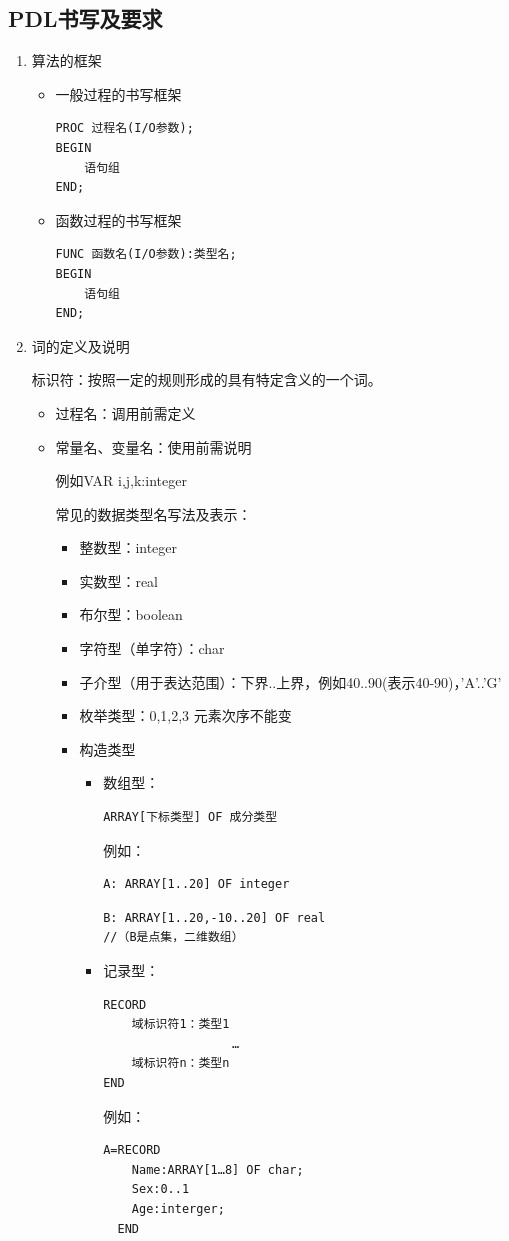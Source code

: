 \documentclass[AutoFakeBold]{LZUThesis2007}
\begin{document}
		\subsection{PDL书写及要求}
			\begin{enumerate}
				\item 算法的框架
					\begin{itemize}
						\item 一般过程的书写框架
\begin{lstlisting}
PROC 过程名(I/O参数);
BEGIN
	语句组
END;
\end{lstlisting}
						\item 函数过程的书写框架
\begin{lstlisting}
FUNC 函数名(I/O参数):类型名;
BEGIN
	语句组
END;
\end{lstlisting}
					\end{itemize}
				\item 词的定义及说明

						标识符：按照一定的规则形成的具有特定含义的一个词。
						\begin{itemize}
							\item 过程名：调用前需定义
							\item 常量名、变量名：使用前需说明

									例如VAR i,j,k:integer

									常见的数据类型名写法及表示：
									\begin{itemize}
										\item 整数型：integer
										\item 实数型：real
										\item 布尔型：boolean
										\item 字符型（单字符）：char
										\item 子介型（用于表达范围）：下界..上界，例如40..90(表示40-90)，'A'..'G'
										\item 枚举类型：{0,1,2,3}  元素次序不能变
										\item 构造类型
											\begin{itemize}
												\item 数组型：
\begin{lstlisting}
ARRAY[下标类型] OF 成分类型
\end{lstlisting}
												例如：
\begin{lstlisting}
A: ARRAY[1..20] OF integer
\end{lstlisting}
\begin{lstlisting}
B: ARRAY[1..20,-10..20] OF real	
//（B是点集，二维数组）
\end{lstlisting}
												\item 记录型：
\begin{lstlisting}
RECORD
	域标识符1：类型1
	              …
	域标识符n：类型n
END
\end{lstlisting}
例如：
\begin{lstlisting}
A=RECORD
	Name:ARRAY[1…8] OF char;
	Sex:0..1
	Age:interger;
  END
\end{lstlisting}


\end{itemize}
\end{itemize}
\end{itemize}
\end{enumerate}
\end{document}
